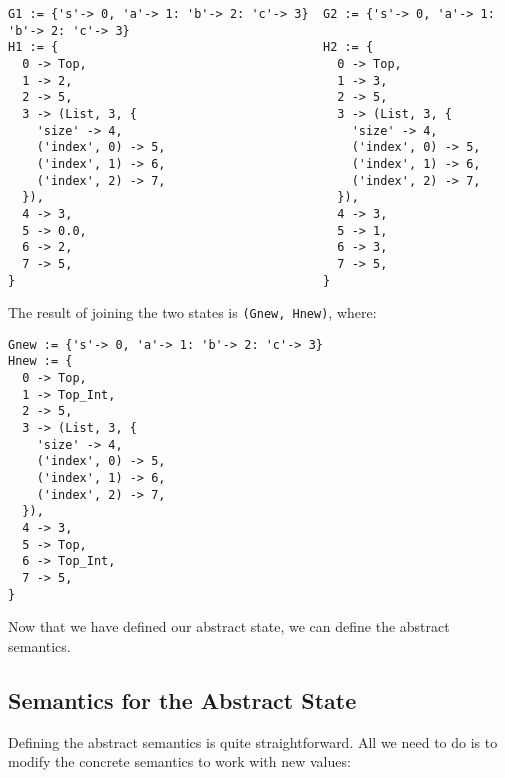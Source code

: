 \begin{verbatim}
G1 := {'s'-> 0, 'a'-> 1: 'b'-> 2: 'c'-> 3}  G2 := {'s'-> 0, 'a'-> 1: 'b'-> 2: 'c'-> 3}
H1 := {                                     H2 := {
  0 -> Top,                                   0 -> Top,
  1 -> 2,                                     1 -> 3,
  2 -> 5,                                     2 -> 5,
  3 -> (List, 3, {                            3 -> (List, 3, {
    'size' -> 4,                                'size' -> 4,
    ('index', 0) -> 5,                          ('index', 0) -> 5,
    ('index', 1) -> 6,                          ('index', 1) -> 6,
    ('index', 2) -> 7,                          ('index', 2) -> 7,
  }),                                         }),
  4 -> 3,                                     4 -> 3,
  5 -> 0.0,                                   5 -> 1,
  6 -> 2,                                     6 -> 3,
  7 -> 5,                                     7 -> 5,
}                                           }
\end{verbatim}

The result of joining the two states is \verb+(Gnew, Hnew)+, where:

\begin{verbatim}
Gnew := {'s'-> 0, 'a'-> 1: 'b'-> 2: 'c'-> 3}
Hnew := {
  0 -> Top,
  1 -> Top_Int,
  2 -> 5,
  3 -> (List, 3, {
    'size' -> 4,
    ('index', 0) -> 5,
    ('index', 1) -> 6,
    ('index', 2) -> 7,
  }),
  4 -> 3,
  5 -> Top,
  6 -> Top_Int,
  7 -> 5,
}
\end{verbatim}

Now that we have defined our abstract state, we can define the abstract semantics.

\subsection{Semantics for the Abstract State}

Defining the abstract semantics is quite straightforward. All we need to do is to modify
the concrete semantics to work with new values:

